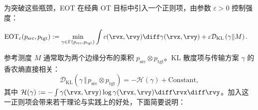 为突破这些瓶颈，EOT 在经典 OT 目标中引入一个正则项，由参数 $\varepsilon > 0$ 控制强度：
\begin{mdframed}
    \begin{align}\label{eq:eot-epsilon}
\begin{aligned}
        \text{EOT}_\varepsilon(p_{\mathrm{src}}, p_{\mathrm{tgt}}) &:= \min_{\gamma \in \Gamma(p_{\mathrm{src}}, p_{\mathrm{tgt}})} \int c(\rvx,  \rvy)  \diff\gamma(\rvx, \rvy)
        + \varepsilon \mathcal{D}_{\text{KL}}\left(\gamma \Vert M \right).
\end{aligned}
\end{align}
\end{mdframed}
参考测度 $M$ 通常取为两个边缘分布的乘积 $p_{\mathrm{src}} \otimes p_{\mathrm{tgt}}$。KL 散度项与传输方案 $\gamma$ 的香农熵直接相关：
\[
\mathcal{D}_{\text{KL}}(\gamma \,\Vert\, p_{\mathrm{src}} \otimes p_{\mathrm{tgt}}) = -\mathcal{H}(\gamma) + \text{Constant},
\]
其中 $\mathcal{H}(\gamma) := -\int \gamma(\rvx, \rvy) \log \gamma(\rvx, \rvy) \diff \rvx \diff \rvy$。加入这一正则项会带来若干理论与实践上的好处，下面简要说明：

